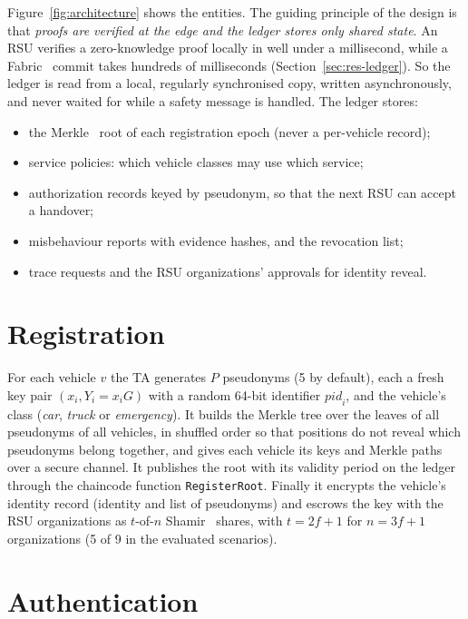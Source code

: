 Figure~\ref{fig:architecture} shows the entities. The guiding principle of the design is that
\emph{proofs are verified at the edge and the ledger stores only shared state}. An RSU verifies a
zero-knowledge proof locally in well under a millisecond, while a Fabric~\cite{androulaki2018fabric} commit takes hundreds of
milliseconds (Section~\ref{sec:res-ledger}). So the ledger is read from a local, regularly
synchronised copy, written asynchronously, and never waited for while a safety message is handled.
The ledger stores:
\begin{itemize}
  \item the Merkle~\cite{merkle1987} root of each registration epoch (never a per-vehicle record);
  \item service policies: which vehicle classes may use which service;
  \item authorization records keyed by pseudonym, so that the next RSU can accept a handover;
  \item misbehaviour reports with evidence hashes, and the revocation list;
  \item trace requests and the RSU organizations' approvals for identity reveal.
\end{itemize}

\section{Registration}

For each vehicle $v$ the TA generates $P$ pseudonyms (5 by default), each a fresh key pair
$(x_i, Y_i = x_i G)$ with a random 64-bit identifier $\mathit{pid}_i$, and the vehicle's class
(\textit{car}, \textit{truck} or \textit{emergency}). It builds the Merkle tree over the leaves of
all pseudonyms of all vehicles, in shuffled order so that positions do not reveal which pseudonyms
belong together, and gives each vehicle its keys and Merkle paths over a secure channel. It publishes
the root with its validity period on the ledger through the chaincode function
\texttt{RegisterRoot}. Finally it encrypts the vehicle's identity record (identity and list of
pseudonyms) and escrows the key with the RSU organizations as $t$-of-$n$ Shamir~\cite{shamir1979} shares, with
$t = 2f+1$ for $n = 3f+1$ organizations (5 of 9 in the evaluated scenarios).

\section{Authentication}\label{sec:auth}

